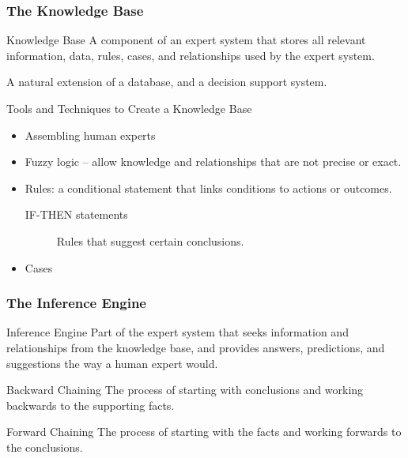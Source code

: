 \documentclass[\main/notes.tex]{subfiles}
\begin{document}
				\subsubsection{The Knowledge Base}
					\begin{definition}{Knowledge Base}
						A component of an expert system that stores all relevant information, data, rules, cases, and relationships used by the expert system.

						A natural extension of a database, and a decision support system.
					\end{definition}
					\begin{sidenote}{Tools and Techniques to Create a Knowledge Base}
						\begin{itemize}
							\item Assembling human experts
							\item Fuzzy logic -- allow knowledge and relationships that are not precise or exact.
							\item Rules: a conditional statement that links conditions to actions or outcomes.
								\begin{indentparagraph}
									\begin{description}
										\item[IF-THEN statements] Rules that suggest certain conclusions.
									\end{description}
								\end{indentparagraph}
							\item Cases
						\end{itemize}
					\end{sidenote}
				\subsubsection{The Inference Engine}
					\begin{definition}{Inference Engine}
						Part of the expert system that seeks information and relationships from the knowledge base, and provides answers, predictions, and suggestions the way a human expert would.
					\end{definition}
					\begin{definition}{Backward Chaining}
						The process of starting with conclusions and working backwards to the supporting facts.
					\end{definition}
					\begin{definition}{Forward Chaining}
						The process of starting with the facts and working forwards to the conclusions.
					\end{definition}
\end{document}
